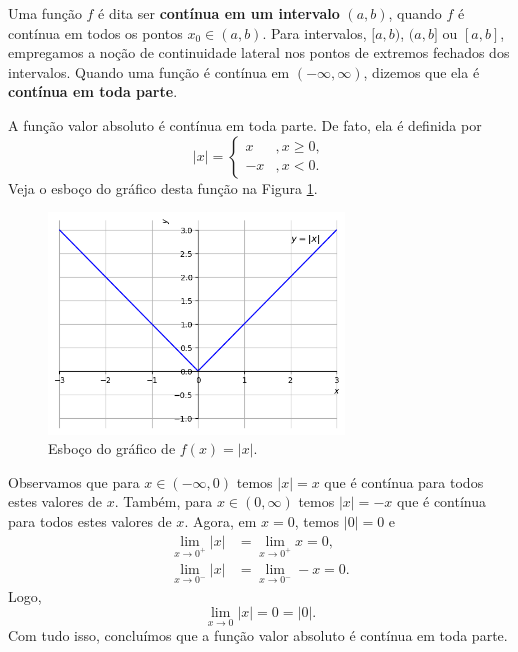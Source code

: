 Uma função $f$ é dita ser {\bf contínua em um intervalo} $(a, b)$, quando $f$ é contínua em todos os pontos $x_0\in (a, b)$. Para intervalos, $[a, b)$, $(a, b]$ ou $[a, b]$, empregamos a noção de continuidade lateral nos pontos de extremos fechados dos intervalos. Quando uma função é contínua em $(-\infty, \infty)$, dizemos que ela é {\bf contínua em toda parte}.

\begin{ex}\label{ex:lim_fabs_cont}
  A função valor absoluto é contínua em toda parte. De fato, ela é definida por
  \begin{equation}
    |x| = \left\{
      \begin{array}{ll}
        x &, x\geq 0,\\
        -x &, x<0.
      \end{array}
    \right.
  \end{equation}
  Veja o esboço do gráfico desta função na Figura \ref{fig:funabs}.

  \begin{figure}[H]
    \centering
    \includegraphics[width=0.7\textwidth]{cap_lim/dados/fig_funabs/fig}
    \caption{Esboço do gráfico de $f(x) = |x|$.}
    \label{fig:funabs}
  \end{figure}
  
  Observamos que para $x\in(-\infty, 0)$ temos $|x| = x$ que é contínua para todos estes valores de $x$. Também, para $x\in(0,\infty)$ temos $|x|=-x$ que é contínua para todos estes valores de $x$. Agora, em $x=0$, temos $|0|=0$ e
  \begin{align}
    \lim_{x\to 0^+} |x| &= \lim_{x\to 0^+} x = 0,\\
    \lim_{x\to 0^-} |x| &= \lim_{x\to 0^-} -x = 0.
  \end{align}
  Logo,
  \begin{equation}
    \lim_{x\to 0} |x| = 0 = |0|.
  \end{equation}
  Com tudo isso, concluímos que a função valor absoluto é contínua em toda parte.
\end{ex}

